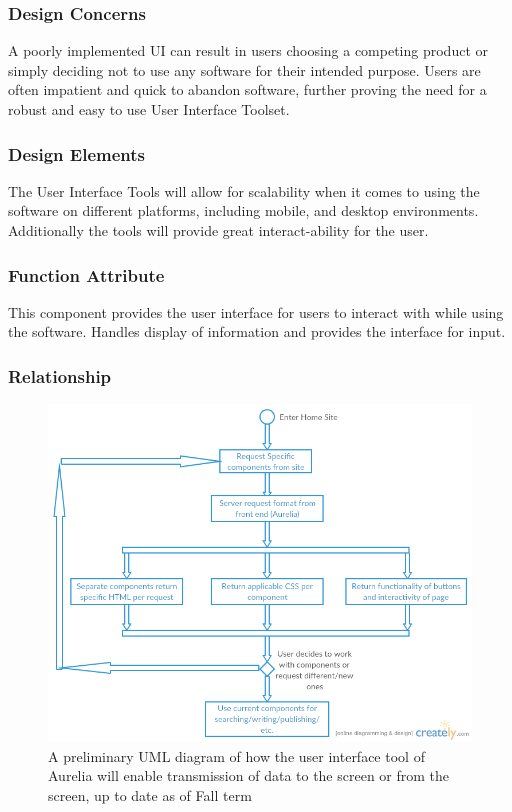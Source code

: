 \documentclass[onecolumn, draftclsnofoot,10pt, compsoc]{IEEEtran}
\begin{document}
\subsubsection{Design Concerns}
\noindent A poorly implemented UI can result in users choosing a competing
product or simply deciding not to use any software for their intended purpose.
Users are often impatient and quick to abandon software, further proving the 
need for a robust and easy to use User Interface Toolset.  \\

\subsubsection{Design Elements}
\noindent The User Interface Tools will allow for scalability when it comes to
using the software on different platforms, including mobile, and desktop 
environments. Additionally the tools will provide great interact-ability for 
the user. \\

\subsubsection{Function Attribute}
\noindent This component provides the user interface for users to interact with while using the software. Handles display of information and provides the interface for input. \\

\subsubsection{Relationship}
\begin{figure}[ht!]
\centering
\includegraphics[width=140mm]{user_interface_tools.png}
\caption{A preliminary UML diagram of how the user interface tool of
	Aurelia will enable transmission of data to the screen or from the 
	screen, up to date as of Fall term}
\end{figure}
\end{document}
